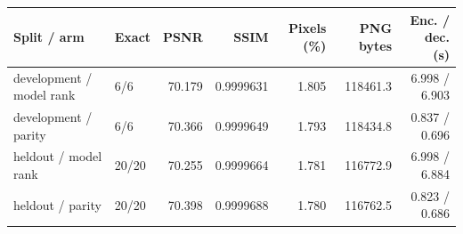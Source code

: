 \begin{tabular}{llrrrrr}
\hline
Split / arm & Exact & PSNR & SSIM & Pixels (\%) & PNG bytes & Enc. / dec. (s) \\
\hline
development / model rank & 6/6 & 70.179 & 0.9999631 & 1.805 & 118461.3 & 6.998 / 6.903 \\
development / parity & 6/6 & 70.366 & 0.9999649 & 1.793 & 118434.8 & 0.837 / 0.696 \\
heldout / model rank & 20/20 & 70.255 & 0.9999664 & 1.781 & 116772.9 & 6.998 / 6.884 \\
heldout / parity & 20/20 & 70.398 & 0.9999688 & 1.780 & 116762.5 & 0.823 / 0.686 \\
\hline
\end{tabular}
